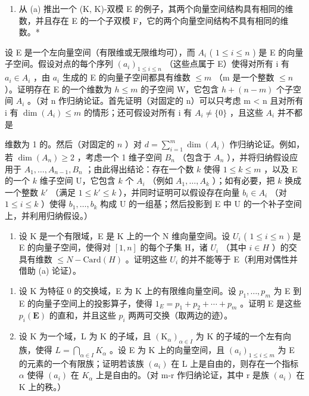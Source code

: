 \begin{enumerate}
\def\labelenumi{(\alph{enumi})}
\setcounter{enumi}{1}
\tightlist
\item
  从 (a) 推出一个 (K, K)-双模 E 的例子，其两个向量空间结构具有相同的维数，并且存在 E 的一个子双模 F，它的两个向量空间结构不具有相同的维数。*
\end{enumerate}

设 E 是一个左向量空间（有限维或无限维均可），而 \(A_{i}\) ( \(1 \leqslant i \leqslant n\) ) 是 E 的向量子空间。假设对点的每个序列 \((a_{i})_{1 \leqslant i \leqslant n}\) （这些点属于 E）使得对所有 i 有 \(a_{i} \in A_{i}\) ，由 \(a_{i}\) 生成的 E 的向量子空间都具有维数 \(\leqslant m\) （m 是一个整数 \(\leqslant n\) ）。证明存在 E 的一个维数为 \(h \leqslant m\) 的子空间 W，它包含 \(h + (n - m)\) 个子空间 \(A_{i}\) 。（对 n 作归纳论证。首先证明（对固定的 n）可以只考虑 m \textless{} n 且对所有 i 有 \(\dim(A_{i}) \leqslant m\) 的情形；还可假设对所有 i 有 \(A_{i} \neq \{0\}\) ，且这些 \(A_{i}\) 并不都是

维数为 1 的。然后（对固定的 \(n\) ）对 \(d = \sum_{i=1}^{m} \dim(A_i)\) 作归纳论证。例如，若 \(\dim(A_n) \geqslant 2\) ，考虑一个 1 维子空间 \(B_n\) （包含于 \(A_n\) ），并将归纳假设应用于 \(A_1, \ldots, A_{n-1}, B_n\) ；由此得出结论：存在一个数 \(k\) 使得 \(1 \leqslant k \leqslant m\) ，以及 E 的一个 \(k\) 维子空间 U，它包含 \(k\) 个 \(A_i\) （例如 \(A_1, \ldots, A_k\) ）；如有必要，把 \(k\) 换成一个整数 \(k'\) （满足 \(1 \leqslant k' \leqslant k\) ），并同时证明可以假设存在向量 \(b_i \in A_i\) （对 \(1 \leqslant i \leqslant k\) ）使得 \(b_1, \ldots, b_k\) 构成 U 的一组基；然后投影到 E 中 U 的一个补子空间上，并利用归纳假设。）

\begin{enumerate}
\def\labelenumi{(\alph{enumi})}
\setcounter{enumi}{1}
\tightlist
\item
  设 K 是一个有限域，E 是 K 上的一个 N 维向量空间。设 \(U_{i}\) ( \(1 \leqslant i \leqslant n\) ) 是 E 的向量子空间，使得对 \([1, n]\) 的每个子集 H，诸 \(U_{i}\) （其中 \(i \in H\) ）的交具有维数 \(\leqslant N - \text{Card}(H)\) 。证明这些 \(U_{i}\) 的并不能等于 E（利用对偶性并借助 (a) 论证）。
\end{enumerate}

\begin{enumerate}
\def\labelenumi{\arabic{enumi}.}
\setcounter{enumi}{37}
\item
  设 K 为特征 0 的交换域，E 为 K 上的有限维向量空间。设 \(p_{1}, \ldots, p_{m}\) 为 E 到 E 的向量子空间上的投影算子，使得 \(1_{E} = p_{1} + p_{2} + \cdots + p_{m}\) 。证明 E 是这些 \(p_i(\mathbf{E})\) 的直和，并且这些 \(p_i\) 两两可交换（取两边的迹）。
\item
  设 K 为一个域，L 为 K 的子域，且 \((\mathrm{K}_{\alpha})_{\alpha\in I}\) 为 K 的子域的一个左有向族，使得 \(L=\bigcap_{\alpha\in I}K_{\alpha}\) 。设 E 为 K 上的向量空间，且 \((a_{i})_{1\leqslant i\leqslant m}\) 为 E 的元素的一个有限族；证明若该族 \((a_{i})\) 在 L 上是自由的，则存在一个指标 \(\alpha\) 使得 \((a_{i})\) 在 \(K_{\alpha}\) 上是自由的。（对 m-r 作归纳论证，其中 r 是族 \((a_{i})\) 在 K 上的秩。）
\end{enumerate}

